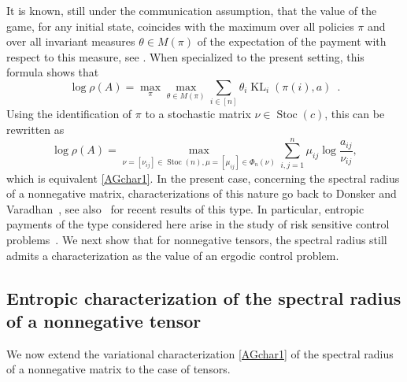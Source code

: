 \documentclass{amsart}
\newcommand{\0}{\mathbf{0}}
\newcommand{\1}{\mathbf{1}}
\theoremstyle{remark}
\numberwithin{equation}{section} %
\begin{document}
It is known, still under the communication assumption,
 that the value of the game, for any initial state,
coincides with the maximum over all policies $\pi$ and over
all invariant measures $\theta\in M(\pi)$ of the expectation
of the payment with respect to this measure, see 
 \cite[Proposition 7.2]{AG03}. When specialized
to the present setting, this formula shows that
\[
\log \rho(A) = \max_{\pi} \max_{\theta\in M(\pi)} 
\sum_{i\in[n]} \theta_i \operatorname{KL}_i(\pi(i),a) \enspace .
\]
Using the identification of $\pi$ to a stochastic matrix
$\nu\in \operatorname{Stoc}(c)$, 
this can be rewritten as 
\[\log\rho(A)=\max_{\nu=[\nu_{ij}]\in \operatorname{Stoc}(n), \mu=[\mu_{ij}]\in\Phi_n(\nu)}\sum_{i,j=1}^n \mu_{ij}\log \frac{a_{ij}}{\nu_{ij}},\]
which is equivalent
%
%
%
%
%
%
\eqref{AGchar1}. In the present case, concerning the spectral radius {{of}} a nonnegative matrix, characterizations of this nature go back to Donsker and Varadhan~\cite{DV75},
see also~\cite{AB17,akian_et_al:LIPIcs:2017:7026} for recent results
of this type. In particular, entropic payments of the type
considered here arise in the study of risk sensitive control
problems~\cite{AB17}. We next show that for nonnegative tensors,
the spectral radius still admits a characterization as the value
of an ergodic control problem.

%
%

\subsection{Entropic characterization of the spectral radius of a nonnegative tensor}\label{subsecmain}
We now extend the variational characterization \eqref{AGchar1} of the spectral
radius of a nonnegative matrix to the case of tensors.
%
%
%
\end{document}
